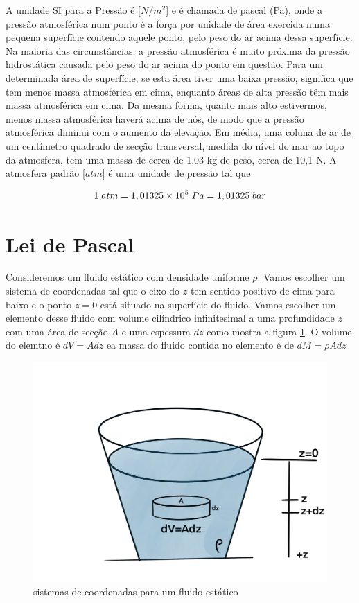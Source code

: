 \documentclass[
  portuguese,
  ]{book}
\begin{document}
A unidade SI para a Pressão é {[}\(N/m^2\){]} e é chamada de pascal (Pa), onde a pressão atmosférica num ponto é a força por unidade de área exercida numa pequena superfície contendo aquele ponto, pelo peso do ar acima dessa superfície. Na maioria das circunstâncias, a pressão atmosférica é muito próxima da pressão hidrostática causada pelo peso do ar acima do ponto em questão. Para um determinada área de superfície, se esta área tiver uma baixa pressão, significa que tem menos massa atmosférica em cima, enquanto áreas de alta pressão têm mais massa atmosférica em cima. Da mesma forma, quanto mais alto estivermos, menos massa atmosférica haverá acima de nós, de modo que a pressão atmosférica diminui com o aumento da elevação. Em média, uma coluna de ar de um centímetro quadrado de secção transversal, medida do nível do mar ao topo da atmosfera, tem uma massa de cerca de 1,03 kg de peso, cerca de 10,1 N. A atmosfera padrão {[}\(atm\){]} é uma unidade de pressão tal que

\begin{equation}
1 \hspace{0.1cm}atm = 1,01325 \times 10^5 \hspace{0.1cm} Pa = 1,01325 \hspace{0.1cm}bar
\label{eq:hidros5}
\end{equation}

\hypertarget{lei-de-pascal}{%
\section{Lei de Pascal}\label{lei-de-pascal}}

Consideremos um fluido estático com densidade uniforme \(\rho\). Vamos escolher um sistema de coordenadas tal que o eixo do \(z\) tem sentido positivo de cima para baixo e o ponto \(z=0\) está situado na superfície do fluido. Vamos escolher um elemento desse fluido com volume cilíndrico infinitesimal a uma profundidade \(z\) com uma área de secção \(A\) e uma espessura \(dz\) como mostra a figura \ref{fig:imghidros2}. O volume do elemtno é \(dV=Adz\) ea massa do fluido contida no elemento é de \(dM=\rho Adz\)

\begin{figure}

{\centering \includegraphics[width=0.7\linewidth]{img/hidros_2} 

}

\caption{sistemas de coordenadas para um fluido estático}\label{fig:imghidros2}
\end{figure}
\end{document}
